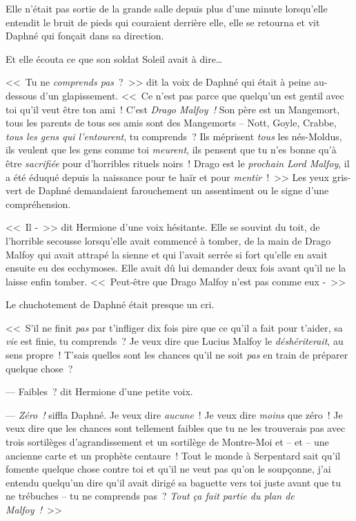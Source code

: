 Elle n'était pas sortie de la grande salle depuis plus d'une minute lorsqu'elle entendit le bruit de pieds qui couraient derrière elle, elle se retourna et vit Daphné qui fonçait dans sa direction.

Et elle écouta ce que son soldat Soleil avait à dire…

<<~Tu ne \emph{comprends pas}~?~>> dit la voix de Daphné qui était à peine au-dessous d'un glapissement. <<~Ce n'est pas parce que quelqu'un est gentil avec toi qu'il veut être ton ami~! C'est \emph{Drago Malfoy~!} Son père est un Mangemort, tous les parents de tous ses amis sont des Mangemorts -- Nott, Goyle, Crabbe, \emph{tous les gens qui l'entourent}, tu comprends~? Ils méprisent \emph{tous} les nés-Moldus, ils veulent que les gens comme toi \emph{meurent}, ils pensent que tu n'es bonne qu'à être \emph{sacrifiée} pour d'horribles rituels noirs~! Drago est le \emph{prochain Lord Malfoy}, il a été éduqué depuis la naissance pour te haïr et pour \emph{mentir}~!~>> Les yeux gris-vert de Daphné demandaient farouchement un assentiment ou le signe d'une compréhension.

<<~Il -~>> dit Hermione d'une voix hésitante. Elle se souvint du toit, de l'horrible secousse lorsqu'elle avait commencé à tomber, de la main de Drago Malfoy qui avait attrapé la sienne et qui l'avait serrée si fort qu'elle en avait ensuite eu des ecchymoses. Elle avait dû lui demander deux fois avant qu'il ne la laisse enfin tomber. <<~Peut-être que Drago Malfoy n'est pas comme eux -~>>

Le chuchotement de Daphné était presque un cri.

<<~S'il ne finit \emph{pas} par t'infliger dix fois pire que ce qu'il a fait pour t'aider, sa \emph{vie} est finie, tu comprends~? Je veux dire que Lucius Malfoy le \emph{déshériterait}, au sens propre~! T'sais quelles sont les chances qu'il ne soit \emph{pas} en train de préparer quelque chose~?

--- Faibles~? dit Hermione d'une petite voix.

--- \emph{Zéro~!} siffla Daphné. Je veux dire \emph{aucune}~! Je veux dire \emph{moins} que zéro~! Je veux dire que les chances sont tellement faibles que tu ne les trouverais pas avec trois sortilèges d'agrandissement et un sortilège de Montre-Moi et -- et -- une ancienne carte et un prophète centaure~! Tout le monde à Serpentard sait qu'il fomente quelque chose contre toi et qu'il ne veut pas qu'on le soupçonne, j'ai entendu quelqu'un dire qu'il avait dirigé sa baguette vers toi juste avant que tu ne trébuches -- tu ne comprends pas~? \emph{Tout ça fait partie du plan de Malfoy~!}~>>

